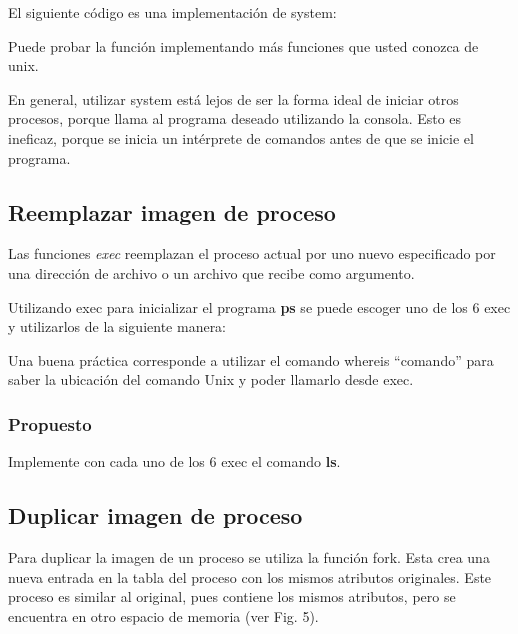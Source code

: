 \documentclass[journal]{IEEEtai}
\begin{document}
El siguiente código es una implementación de system:



Puede probar la función implementando más funciones que usted conozca de unix.

En general, utilizar system está lejos de ser la forma ideal de iniciar otros procesos, porque llama al programa deseado utilizando la consola. Esto es ineficaz, porque se inicia un intérprete de comandos antes de que se inicie el programa.

\subsection{Reemplazar imagen de proceso}

Las funciones \textit{exec} reemplazan el proceso actual por uno nuevo especificado por una dirección de archivo o un archivo que recibe como argumento.



Utilizando exec para inicializar el programa \textbf{ps} se puede escoger uno de los 6 exec y utilizarlos de la siguiente manera:



Una buena práctica corresponde a utilizar el comando whereis ``comando'' para saber la ubicación del comando Unix y poder llamarlo desde exec.

\subsubsection{\textbf{Propuesto}} Implemente con cada uno de los 6 exec el comando \textbf{ls}.

\subsection{Duplicar imagen de proceso}

Para duplicar la imagen de un proceso se utiliza la función fork. Esta crea una nueva entrada en la tabla del proceso con los mismos atributos originales. Este proceso es similar al original, pues contiene los mismos atributos, pero se encuentra en otro espacio de memoria (ver Fig. 5).


\end{document}
